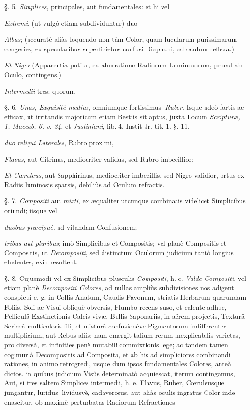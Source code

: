 \documentclass[a4paper, 11pt, oneside, polutonikogreek, german]{article}
\begin{document}
§. 5. \emph{Simplices}, principales, aut fundamentales: et hi vel

\emph{Extremi}, (ut vulgò etiam subdividuntur) duo

\emph{Albus}; (accuratè aliàs loquendo non tàm Color, quam lucularum purissimarum congeries, ex specularibus superficiebus confusi Diaphani, ad oculum reflexa.)

\emph{Et Niger} (Apparentia potius, ex aberratione Radiorum Luminosorum, procul ab Oculo, contingens.)

\emph{Intermedii} tres: quorum

§. 6. \emph{Unus, Exquisitè medius}, omniumque fortissimus, \emph{Ruber}. Isque adeò fortis ac efficax, ut irritandis majoricum etiam Bestiis sit aptus, juxta Locum \emph{Scripturæ, 1. Maccab. 6. v. 34.} et \emph{Justiniani}, lib. 4. Instit Jr. tit. 1. §. 11.

\emph{duo reliqui Laterales}, Rubro proximi,

\emph{Flavus}, aut Citrinus, mediocriter validus, sed Rubro imbecillior:

\emph{Et Cœruleus}, aut Sapphirinus, mediocriter imbecillis, sed Nigro validior, ortus ex Radiis luminosis sparsis, debiliùs ad Oculum refractis.

§. 7. \emph{Compositi} aut \emph{mixti}, ex æqualiter utcunque combinatis videlicet Simplicibus oriundi; iisque vel

\emph{duobus præcipuè}, ad vitandam Confusionem;

\emph{tribus aut pluribus}; imò Simplicibus et Compositis; vel planè Compositis et Compositis, ut \emph{Decompositi}, sed distinctum Oculorum judicium tantò longius eludentes, exin resultent.

§. 8. Cujusmodi vel ex Simplicibus plusculis \emph{Compositi}, h. e. \emph{Valde-Compositi}, vel etiam planè \emph{Decompositi Colores}, ad nullas ampliùs subdivisiones nos adigent, conspicui e. g. in Collis Anatum, Caudis Pavonum, striatis Herbarum quarundam Foliis, Soli ac Visui obliquè obversis, Plumbo recens-suso, et calente adhuc, Pelliculâ Exstinctionis Calcis vivæ, Bullis Saponariis, in aërem projectis, Texturâ Sericeâ multicoloris fili, et misturâ confusionéve Pigmentorum indifferenter multiplicium, aut Rebus aliis: nam emergit talium rerum inexplicabilis varietas, pro diversâ, et infinities penè mutabili commixtionis lege; ac tandem tamen cogimur à Decompositis ad Composita, et ab his ad simpliciores combinandi rationes, in animo retrogredi, usque dum ipsos fundamentales Colores, anteà dictos, in quibus judicium Visûs determinatò acquiescat, iterum contingamus, Aut, si tres saltem Simplices intermedii, h. e. Flavus, Ruber, Cœruleusque jungantur, luridus, lividusvè, cadaverosus, aut aliàs oculis ingratus Color inde enascitur, ob maximè perturbatas Radiorum Refractiones.
\end{document}
